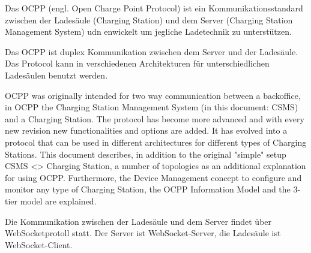 Das OCPP (engl. Open Charge Point Protocol) ist ein Kommunikationsstandard zwischen der Ladesäule (Charging Station) und dem Server (Charging Station Management System)
udn enwickelt um jegliche Ladetechnik zu unterstützen.\cite[Part 0, 3. Seite]{ocppDocs}

Das OCPP ist duplex Kommunikation zwischen dem Server und der Ladesäule. Das Protocol kann in verschiedenen Architekturen für unterschiedlichen Ladesäulen benutzt werden.

OCPP was originally intended for two way communication between a backoffice, in OCPP the Charging Station Management System
(in this document: CSMS) and a Charging Station. The protocol has become more advanced and with every new revision new
functionalities and options are added. It has evolved into a protocol that can be used in different architectures for different types of
Charging Stations.
This document describes, in addition to the original "simple" setup CSMS <> Charging Station, a number of topologies as an
additional explanation for using OCPP. Furthermore, the Device Management concept to configure and monitor any type of
Charging Station, the OCPP Information Model and the 3-tier model are explained.\cite[Part 1, 3. Seite]{ocppDocs}

Die Kommunikation zwischen der Ladesäule und dem Server findet über WebSocketprotoll statt. 
Der Server ist WebSocket-Server, die Ladesäule ist WebSocket-Client.  \cite[Part 4, 6. Seite ]{ocppDocs}
